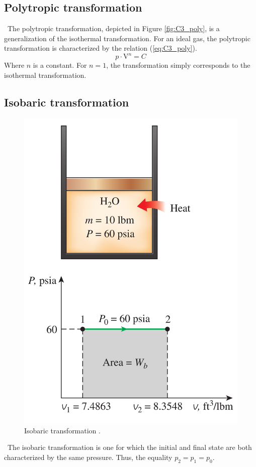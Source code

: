 \subsection{Polytropic transformation}
\quad\ The polytropic transformation, depicted in Figure \ref{fig:C3_poly}, is  a generalization of the isothermal transformation. For an ideal gas, the polytropic transformation is characterized by the relation (\ref{eq:C3_poly}).
\begin{equation}
  p\cdot \mathrm{V}^n = C \label{eq:C3_poly}
\end{equation}
Where $n$ is a constant. 
For $n=1$, the transformation simply corresponds to the isothermal transformation.\clearpage
 
\subsection{Isobaric transformation}
\begin{figure}
  \centering
  \includegraphics{isoP.png}
  \caption{Isobaric transformation \cite{2015}.}
  \label{fig:C3_isoB}
\end{figure}
\quad\ The isobaric transformation is one for which the initial and final state are both characterized by the same pressure. Thus, the equality \(p_2 = p_1 = p_0\). 

